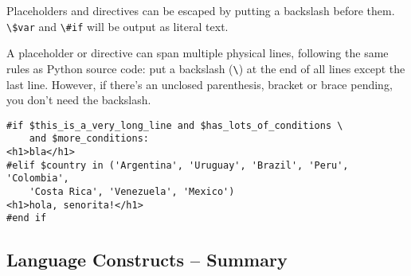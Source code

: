 Placeholders and directives can be escaped by putting a backslash before them.
\verb+\$var+ and \verb+\#if+ will be output as literal text.

A placeholder or directive can span multiple physical lines, following the same
rules as Python source code: put a backslash (\verb+\+) at the end of all
lines except the last line.  However, if there's an unclosed parenthesis,
bracket or brace pending, you don't need the backslash.

\begin{verbatim}
#if $this_is_a_very_long_line and $has_lots_of_conditions \
    and $more_conditions:
<h1>bla</h1>
#elif $country in ('Argentina', 'Uruguay', 'Brazil', 'Peru', 'Colombia',
    'Costa Rica', 'Venezuela', 'Mexico')
<h1>hola, senorita!</h1>
#end if
\end{verbatim}

\subsection{Language Constructs -- Summary}
\label{language.constructs}

